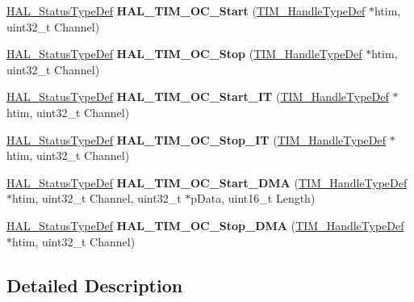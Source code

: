 \begin{DoxyCompactItemize}
\hyperlink{stm32f1xx__hal__def_8h_a63c0679d1cb8b8c684fbb0632743478f}{H\+A\+L\+\_\+\+Status\+Type\+Def} {\bfseries H\+A\+L\+\_\+\+T\+I\+M\+\_\+\+O\+C\+\_\+\+Start} (\hyperlink{struct_t_i_m___handle_type_def}{T\+I\+M\+\_\+\+Handle\+Type\+Def} $\ast$htim, uint32\+\_\+t Channel)
\item 
\mbox{\label{group___t_i_m___exported___functions___group2_ga9cb1f62afb99aea0db8cc28b378b68ad}} 
\hyperlink{stm32f1xx__hal__def_8h_a63c0679d1cb8b8c684fbb0632743478f}{H\+A\+L\+\_\+\+Status\+Type\+Def} {\bfseries H\+A\+L\+\_\+\+T\+I\+M\+\_\+\+O\+C\+\_\+\+Stop} (\hyperlink{struct_t_i_m___handle_type_def}{T\+I\+M\+\_\+\+Handle\+Type\+Def} $\ast$htim, uint32\+\_\+t Channel)
\item 
\mbox{\label{group___t_i_m___exported___functions___group2_gad3116f3b344392f7b947ff1218ba9ed8}} 
\hyperlink{stm32f1xx__hal__def_8h_a63c0679d1cb8b8c684fbb0632743478f}{H\+A\+L\+\_\+\+Status\+Type\+Def} {\bfseries H\+A\+L\+\_\+\+T\+I\+M\+\_\+\+O\+C\+\_\+\+Start\+\_\+\+IT} (\hyperlink{struct_t_i_m___handle_type_def}{T\+I\+M\+\_\+\+Handle\+Type\+Def} $\ast$htim, uint32\+\_\+t Channel)
\item 
\mbox{\label{group___t_i_m___exported___functions___group2_gacc324ef35c0b207a8331c657d86fc1bd}} 
\hyperlink{stm32f1xx__hal__def_8h_a63c0679d1cb8b8c684fbb0632743478f}{H\+A\+L\+\_\+\+Status\+Type\+Def} {\bfseries H\+A\+L\+\_\+\+T\+I\+M\+\_\+\+O\+C\+\_\+\+Stop\+\_\+\+IT} (\hyperlink{struct_t_i_m___handle_type_def}{T\+I\+M\+\_\+\+Handle\+Type\+Def} $\ast$htim, uint32\+\_\+t Channel)
\item 
\mbox{\label{group___t_i_m___exported___functions___group2_ga6f961349029a84317b7734abbfb9a02c}} 
\hyperlink{stm32f1xx__hal__def_8h_a63c0679d1cb8b8c684fbb0632743478f}{H\+A\+L\+\_\+\+Status\+Type\+Def} {\bfseries H\+A\+L\+\_\+\+T\+I\+M\+\_\+\+O\+C\+\_\+\+Start\+\_\+\+D\+MA} (\hyperlink{struct_t_i_m___handle_type_def}{T\+I\+M\+\_\+\+Handle\+Type\+Def} $\ast$htim, uint32\+\_\+t Channel, uint32\+\_\+t $\ast$p\+Data, uint16\+\_\+t Length)
\item 
\mbox{\label{group___t_i_m___exported___functions___group2_ga27f1f66d2d38ec428580a5feb3628c48}} 
\hyperlink{stm32f1xx__hal__def_8h_a63c0679d1cb8b8c684fbb0632743478f}{H\+A\+L\+\_\+\+Status\+Type\+Def} {\bfseries H\+A\+L\+\_\+\+T\+I\+M\+\_\+\+O\+C\+\_\+\+Stop\+\_\+\+D\+MA} (\hyperlink{struct_t_i_m___handle_type_def}{T\+I\+M\+\_\+\+Handle\+Type\+Def} $\ast$htim, uint32\+\_\+t Channel)
\end{DoxyCompactItemize}


\subsection{Detailed Description}
